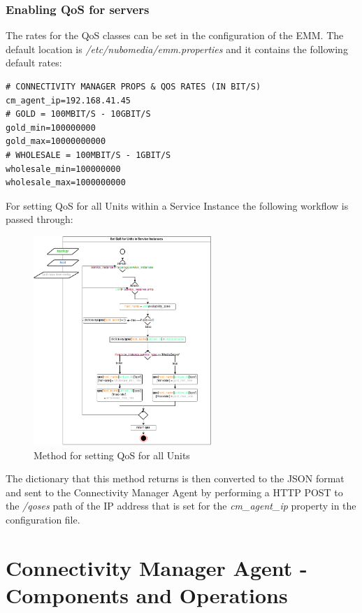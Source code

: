 \subsubsection{Enabling QoS for servers}

The rates for the QoS classes can be set in the configuration of the EMM.
The default location is \textit{/etc/nubomedia/emm.properties} and it contains the following default rates:
\begin{lstlisting}
# CONNECTIVITY MANAGER PROPS & QOS RATES (IN BIT/S)
cm_agent_ip=192.168.41.45
# GOLD = 100MBIT/S - 10GBIT/S
gold_min=100000000
gold_max=10000000000
# WHOLESALE = 100MBIT/S - 1GBIT/S
wholesale_min=100000000
wholesale_max=1000000000
\end{lstlisting}

For setting QoS for all Units within a Service Instance the following workflow is passed through:

\begin{figure}[H]
\centering

\includegraphics[width=0.6\textwidth]{images/design/cm_set_qos.png}

\caption{Method for setting QoS for all Units}
\end{figure}

The dictionary that this method returns is then converted to the JSON format and sent to the Connectivity Manager Agent by performing a HTTP POST to the \textit{/qoses} path of the IP address that is set for the \textit{cm\_agent\_ip} property in the configuration file.

\section{Connectivity Manager Agent - Components and Operations}


